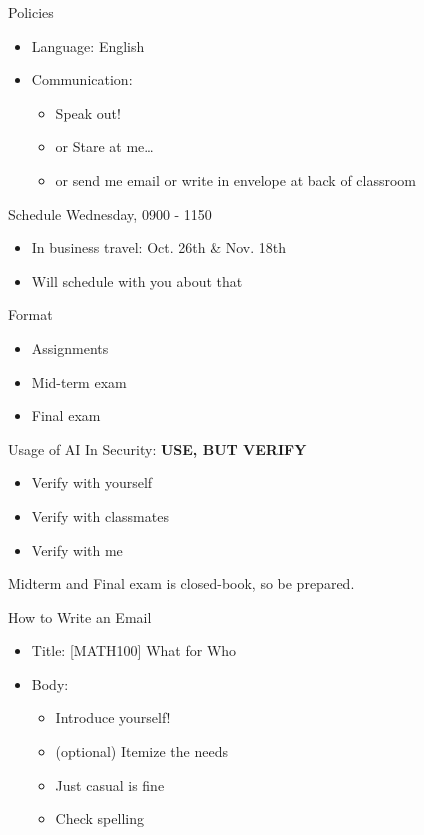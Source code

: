 \begin{frame}{Policies}
  \begin{itemize}
    \item Language: English
    \item Communication:
    \begin{itemize}
      \item Speak out!
      \item or Stare at me\dots
      \item or send me email or write in envelope at back of classroom
    \end{itemize}
  \end{itemize}
\end{frame}

\begin{frame}{Schedule}
  Wednesday, 0900 - 1150
  \begin{itemize}
    \item In business travel: Oct. 26th \& Nov. 18th
    \item Will schedule with you about that
  \end{itemize}
  Format
  \begin{itemize}
    \item Assignments
    \item Mid-term exam
    \item Final exam
  \end{itemize}
\end{frame}

\begin{frame}{Usage of AI}
  In Security: \textbf{USE, BUT VERIFY}\pause
  \begin{itemize}
    \item Verify with yourself\pause
    \item Verify with classmates\pause
    \item Verify with me\pause
  \end{itemize}
  Midterm and Final exam is closed-book, so be prepared.
\end{frame}


\begin{frame}{How to Write an Email}
  \begin{itemize}\pause
    \item Title: [MATH100] {What} for {Who}\pause
    \item Body: \pause
    \begin{itemize}
      \item Introduce yourself!\pause
      \item (optional) Itemize the needs\pause
      \item Just casual is fine\pause
      \item Check spelling
    \end{itemize}
  \end{itemize}
\end{frame}

